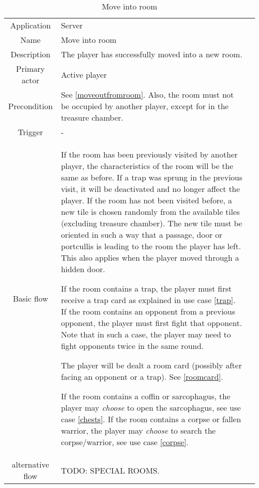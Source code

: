 \documentclass[a4paper,10pt]{report}
\begin{document}
\begin{table}
\caption{Move into room}
\label{moveintoroom}
\begin{tabular}{|c| p{9cm}|c}
\hline
Application & Server & \\
Name & Move into room & \\
Description & The player has successfully moved into a new room. & \\
Primary actor & Active player & \\
Precondition & See \ref{moveoutfromroom}. Also, the room must not be occupied by another player, except for in the treasure chamber. & \\
Trigger & - & \\ \hline
Basic flow & If the room has been previously visited by another player, the characteristics of the room will be the same as before. If a trap was sprung in the previous visit, it will be deactivated and no longer affect the player. If the room has not been visited before, a new tile is chosen randomly from the available tiles (excluding treasure chamber). The new tile must be oriented in such a way that a passage, door or portcullis is leading to the room the player has left. This also applies when the player moved through a hidden door.

If the room contains a trap, the player must first receive a trap card as explained in use case \ref{trap}. If the room contains an opponent from a previous opponent, the player must first fight that opponent. Note that in such a case, the player may need to fight opponents twice in the same round.

The player will be dealt a room card (possibly after facing an opponent or a trap). See \ref{roomcard}.

If the room contains a coffin or sarcophagus, the player may \emph{choose} to open the sarcophagus, see use case \ref{chests}. If the room contains a corpse or fallen warrior, the player may \emph{choose} to search the corpse/warrior, see use case \ref{corpse}.

& \\ \hline
alternative flow &
TODO: SPECIAL ROOMS.
 \\
\hline
\end{tabular}
\end{table}
\end{document}
